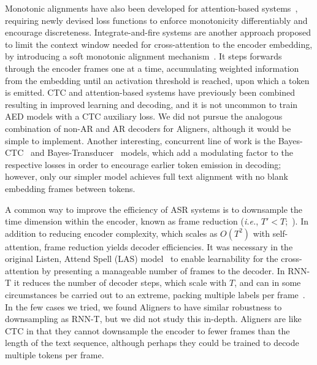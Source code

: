 Monotonic alignments have also been developed for attention-based systems~\citep{raffel2017online}, requiring newly devised loss functions to enforce monotonicity differentiably and encourage discreteness.  Integrate-and-fire systems are another approach proposed to limit the context window needed for cross-attention to the encoder embedding, by introducing a soft monotonic alignment mechanism~\citep{dong2020cif,deng2023label-synchronous,zhang24cif-t}.  It steps forwards through the encoder frames one at a time, accumulating weighted information from the embedding until an activation threshold is reached, upon which a token is emitted. CTC and attention-based systems have previously been combined~\citep{watanabe2017hybrid,tang-etal-2023-hybrid} resulting in improved learning and decoding, and it is not uncommon to train AED models with a CTC auxiliary loss.  We did not pursue the analogous combination of non-AR and AR decoders for Aligners, although it would be simple to implement.  Another interesting, concurrent line of work is the Bayes-CTC~\cite{tian2022bayes} and Bayes-Transducer~\cite{tian2023bayes} models, which add a modulating factor to the respective losses in order to encourage earlier token emission in decoding; however, only our simpler model achieves full text alignment with no blank embedding frames between tokens.

A common way to improve the efficiency of ASR systems is to downsample the time dimension within the encoder, known as frame reduction (\textit{i.e.}, $T'<T$;~\citep{wang2023massive}).  In addition to reducing encoder complexity, which scales as $O(T^2)$ with self-attention, frame reduction yields decoder efficiencies.  It was necessary in the original Listen, Attend Spell (LAS) model~\cite{chan2015listen}  to enable learnability for the cross-attention by presenting a manageable number of frames to the decoder.  In RNN-T it reduces the number of decoder steps, which scale with $T$, and can in some circumstances be carried out to an extreme, packing multiple labels per frame~\cite{prabhavalkar2024extreme}.  In the few cases we tried, we found Aligners to have similar robustness to downsampling as RNN-T, but we did not study this in-depth.  Aligners are like CTC in that they cannot downsample the encoder to fewer frames than the length of the text sequence, although perhaps they could be trained to decode multiple tokens per frame.  




